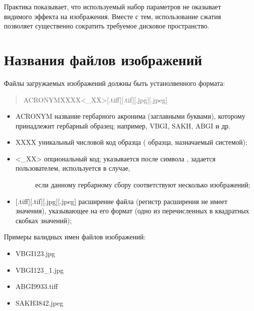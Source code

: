 \documentclass[letterpaper,10pt,russian]{sphinxmanual}
\begin{document}
Практика показывает, что используемый набор параметров не оказывает видимого эффекта на изображения.
Вместе с тем, использование сжатия позволяет существенно сократить требуемое
дисковое пространство.

\ignorespaces 

\section{Названия файлов изображений}
\label{\detokenize{scanning:id9}}\label{\detokenize{scanning:index-2}}
Файлы загружаемых изображений должны быть устанолвенного формата:
\begin{quote}

ACRONYMXXXX\textless{}\_XX\textgreater{}{[}.tiff{]}{[}.tif{]}{[}.jpg{]}{[}.jpeg{]}
\end{quote}
\begin{itemize}
\item {} 
ACRONYM \textendash{} название гербарного акронима (заглавными буквами), которому принадлежит
гербарный образец; например, VBGI, SAKH, ABGI и др.

\item {} 
XXXX \textendash{} уникальный числовой код образца ( образца, назначаемый системой);

\item {} \begin{description}
\item[{\textless{}\_XX\textgreater{} \textendash{} опциональный код; указывается после символа \sphinxtitleref{\_}, задается пользователем, используется в случае,}] \leavevmode
если данному гербарному сбору соответствуют несколько изображений;

\end{description}

\item {} 
{[}.tiff{]}{[}.tif{]}{[}.jpg{]}{[}.jpeg{]}  \textendash{} расширение файла (регистр расширения не имеет значения),
указывающее на его формат (одно из перечисленных в квадратных скобках значений);

\end{itemize}

Примеры валидных имен файлов изображений:
\begin{itemize}
\item {} 
VBGI123.jpg

\item {} 
VBGI123\_1.jpg

\item {} 
ABGI9933.tiff

\item {} 
SAKH3842.jpeg

\end{itemize}
\end{document}
